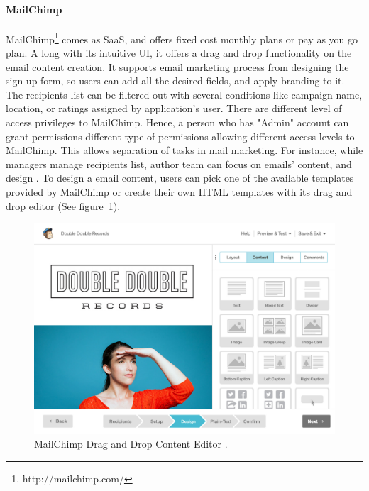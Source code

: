 \paragraph{MailChimp}
MailChimp\footnote{http://mailchimp.com/} comes as \ac{SaaS}, and offers fixed cost monthly plans or pay as you go plan. A long with its intuitive \ac{UI}, it offers a drag and drop functionality on the email content creation. It supports email marketing process from designing the sign up form, so users can add all the desired fields, and apply branding to it. The recipients list can be filtered out with several conditions like campaign name, location, or ratings assigned by application's user. There are different level of access privileges to MailChimp. Hence, a person who has "Admin" account can grant permissions different type of permissions allowing different access levels to MailChimp. This allows separation of tasks in mail marketing. For instance, while managers manage recipients list, author team can focus on emails' content, and design \citep{TheRocketScienceGroupLLC2013}. To design a email content, users can pick one of the available templates provided by MailChimp or create their own \ac{HTML} templates with its drag and drop editor (See figure~\ref{fig:MailChimp-DragAndDropEditor}).
\vspace{1cm}

\begin{figure}[H]
	\includegraphics[width=1.00\textwidth]{imgs/MailChimp-DragAndDropEditor.jpg}
	\caption[MailChimp Drag and Drop Content Editor]{MailChimp Drag and Drop Content Editor \citep{TheRocketScienceGroupLLC2013a}.}
	\label{fig:MailChimp-DragAndDropEditor}
\end{figure}

